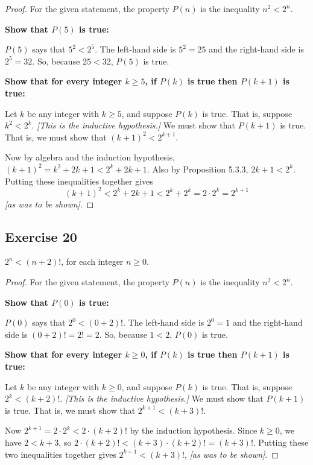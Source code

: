 \documentclass[14pt]{extarticle}
\begin{document}
\begin{proof}
    For the given statement, the property $P(n)$ is the inequality $n^2 < 2^n$.

        {\bf Show that $P(5)$ is true:}

    $P(5)$ says that $5^2 < 2^5$. The left-hand side is $5^2 = 25$ and the right-hand side is $2^5 = 32$. So, because $25 < 32$, $P(5)$ is true.

        {\bf Show that for every integer $k \geq 5$, if $P(k)$ is true then $P(k + 1)$ is true:}

    Let $k$ be any integer with $k \geq 5$, and suppose $P(k)$ is true. That is, suppose $k^2 < 2^k$. {\it [This is the inductive hypothesis.]} We must show that $P(k + 1)$ is true. That is, we must show that $(k+1)^2 < 2^{k+1}$.

    Now by algebra and the induction hypothesis, $(k+1)^2 = k^2 + 2k + 1 < 2^k + 2k + 1$. Also by Proposition 5.3.3, $2k + 1 < 2^k$. Putting these inequalities together gives
    \[
        (k+1)^2 < 2^k + 2k + 1 < 2^k + 2^k = 2 \cdot 2^k = 2^{k+1}
    \]
    {\it [as was to be shown]}.
\end{proof}

\subsection{Exercise 20}
$2^n < (n + 2)!$, for each integer $n \geq 0$.

\begin{proof}
    For the given statement, the property $P(n)$ is the inequality $n^2 < 2^n$.

        {\bf Show that $P(0)$ is true:}

    $P(0)$ says that $2^0 < (0 + 2)!$. The left-hand side is $2^0 = 1$ and the right-hand side is $(0 + 2)! = 2! = 2$. So, because $1 < 2$, $P(0)$ is true.

        {\bf Show that for every integer $k \geq 0$, if $P(k)$ is true then $P(k + 1)$ is true:}

    Let $k$ be any integer with $k \geq 0$, and suppose $P(k)$ is true. That is, suppose $2^k < (k + 2)!$. {\it [This is the inductive hypothesis.]} We must show that $P(k + 1)$ is true. That is, we must show that $2^{k+1} < (k + 3)!$.

    Now $2^{k+1} = 2 \cdot 2^k < 2 \cdot (k+2)!$ by the induction hypothesis. Since $k \geq 0$, we have $2 < k+3$, so $2 \cdot (k+2)! < (k+3) \cdot (k+2)! = (k+3)!$. Putting these two inequalities together gives $2^{k+1} < (k+3)!$, {\it [as was to be shown]}.
\end{proof}
\end{document}
